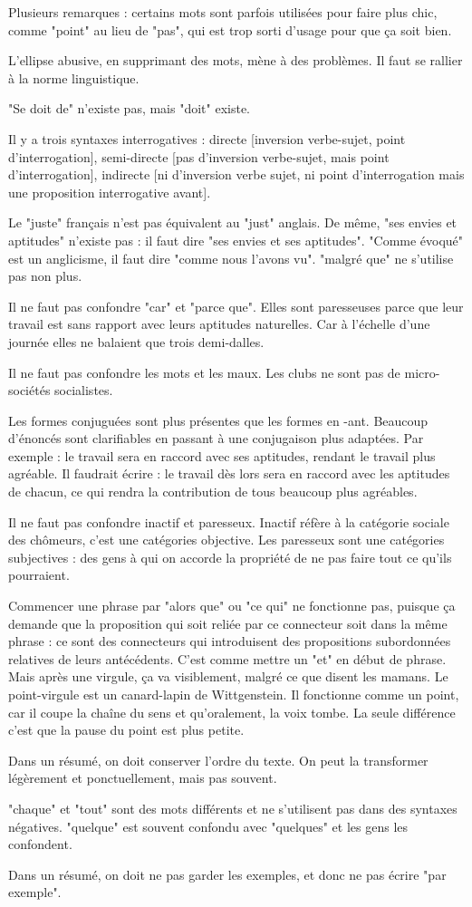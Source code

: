 \documentclass[a4paper,12pt]{book}
\begin{document}
\par Plusieurs remarques : certains mots sont parfois utilisées pour faire plus chic, comme "point" au lieu de "pas", qui est trop sorti d'usage pour que ça soit bien. \par L'ellipse abusive, en supprimant des mots, mène à des problèmes. Il faut se rallier à la norme linguistique. \par "Se doit de" n'existe pas, mais "doit" existe. \par Il y a trois syntaxes interrogatives : directe [inversion verbe-sujet, point d'interrogation], semi-directe [pas d'inversion verbe-sujet, mais point d'interrogation], indirecte [ni d'inversion verbe sujet, ni point d'interrogation mais une proposition interrogative avant]. \par Le "juste" français n'est pas équivalent au "just" anglais. De même, "ses envies et aptitudes" n'existe pas : il faut dire "ses envies et ses aptitudes". "Comme évoqué" est un anglicisme, il faut dire "comme nous l'avons vu". "malgré que" ne s'utilise pas non plus. \par Il ne faut pas confondre "car" et "parce que". Elles sont paresseuses parce que leur travail est sans rapport avec leurs aptitudes naturelles. Car à l'échelle d'une journée elles ne balaient que trois demi-dalles. \par Il ne faut pas confondre les mots et les maux. Les clubs ne sont pas de micro-sociétés socialistes. \par Les formes conjuguées sont plus présentes que les formes en -ant. Beaucoup d'énoncés sont clarifiables en passant à une conjugaison plus adaptées. Par exemple : le travail sera en raccord avec ses aptitudes, rendant le travail plus agréable. Il faudrait écrire : le travail dès lors sera en raccord avec les aptitudes de chacun, ce qui rendra la contribution de tous beaucoup plus agréables. \par Il ne faut pas confondre inactif et paresseux. Inactif réfère à la catégorie sociale des chômeurs, c'est une catégories objective. Les paresseux sont une catégories subjectives : des gens à qui on accorde la propriété de ne pas faire tout ce qu'ils pourraient. \par Commencer une phrase par "alors que" ou "ce qui" ne fonctionne pas, puisque ça demande que la proposition qui soit reliée par ce connecteur soit dans la même phrase : ce sont des connecteurs qui introduisent des propositions subordonnées relatives de leurs antécédents. C'est comme mettre un "et" en début de phrase. Mais après une virgule, ça va visiblement, malgré ce que disent les mamans. Le point-virgule est un canard-lapin de Wittgenstein. Il fonctionne comme un point, car il coupe la chaîne du sens et qu'oralement, la voix tombe. La seule différence c'est que la pause du point est plus petite. \par Dans un résumé, on doit conserver l'ordre du texte. On peut la transformer légèrement et ponctuellement, mais pas souvent. \par "chaque" et "tout" sont des mots différents et ne s'utilisent pas dans des syntaxes négatives. "quelque" est souvent confondu avec "quelques" et les gens les confondent. \par Dans un résumé, on doit ne pas garder les exemples, et donc ne pas écrire "par exemple".
\end{document}
